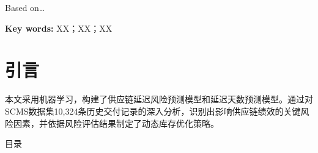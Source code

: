 \documentclass[12pt, a4paper]{article}
\begin{document}
\vspace{0.5\baselineskip} %
\begin{spacing}{1.25} %
Based on…
\end{spacing}

\vspace{0.5\baselineskip} %

\noindent %
{\textbf{Key words:}}{ XX；XX；XX}

\newpage
\section*{\centering \heiti{} \textbf{引\hspace{2em}言}}
\vspace{0.5cm}
\begin{spacing}{1.25} %
\songti{} 
本文采用机器学习，构建了供应链延迟风险预测模型和延迟天数预测模型。通过对SCMS数据集10,324条历史交付记录的深入分析，识别出影响供应链绩效的关键风险因素，并依据风险评估结果制定了动态库存优化策略。
\end{spacing}

\newpage %

\begin{center}
    {\heiti{} 目\hspace{2em}录}\vspace* {-2\baselineskip}
\end{center}
\vspace{0.01cm}

\renewcommand{\contentsname}{} %
\renewcommand{\cfttoctitlefont}{\hfill\heiti\zihao{3}} %
\renewcommand{\cftaftertoctitle}{\hfill} %
\renewcommand{\cftsecfont}{\songti\zihao{-4}} %
\renewcommand{\cftsubsecfont}{\songti\zihao{5}} %
\renewcommand{\cftsecpagefont}{\songti\zihao{-4}} %
\renewcommand{\cftsubsecpagefont}{\songti\zihao{-4}} %
\setlength{\cftbeforesecskip}{10pt} %

\pagestyle{fancy}
\fancyhf{}
\renewcommand{\headrulewidth}{0pt}
\renewcommand{\footrulewidth}{0pt}
\end{document}
